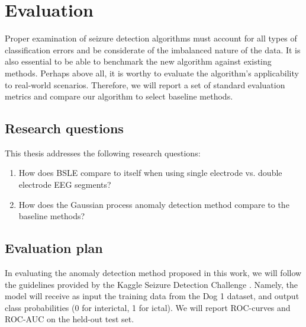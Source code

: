 \chapter{Evaluation}
\label{ch:4evaluation}

Proper examination of seizure detection algorithms must account for all types of classification errors and be considerate of the imbalanced nature of the data. It is also essential to be able to benchmark the new algorithm against existing methods. Perhaps above all, it is worthy to evaluate the algorithm's applicability to real-world scenarios. Therefore, we will report a set of standard evaluation metrics and compare our algorithm to select baseline methods.

\section{Research questions}


This thesis addresses the following research questions:

\begin{enumerate}
    \item How does BSLE compare to itself when using single electrode vs. double electrode EEG segments?
    \item How does the Gaussian process anomaly detection method compare to the baseline methods?
\end{enumerate}


\section{Evaluation plan}
In evaluating the anomaly detection method proposed in this work, we will follow the guidelines provided by the Kaggle Seizure Detection Challenge \cite{kaggle2014}. Namely, the model will receive as input the training data from the Dog 1 dataset, and output class probabilities (0 for interictal, 1 for ictal). We will report ROC-curves and ROC-AUC on the held-out test set.

